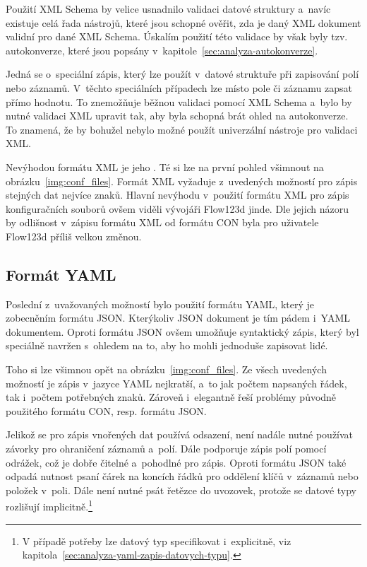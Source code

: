 \documentclass[FM,bw,DP]{tulthesis}
\begin{document}
Použití \gls{XML} Schema by velice usnadnilo validaci datové struktury a~navíc existuje celá řada nástrojů, které jsou schopné ověřit, zda je daný \gls{XML} dokument validní pro dané \gls{XML} Schema. Úskalím použití této validace by však byly tzv. autokonverze, které jsou popsány v~kapitole~\ref{sec:analyza-autokonverze}.

Jedná se o~speciální zápis, který lze použít v~datové struktuře při zapisování polí nebo záznamů. V~těchto speciálních případech lze místo pole či záznamu zapsat přímo hodnotu. To znemožňuje běžnou validaci pomocí XML Schema a~bylo by nutné validaci \gls{XML} upravit tak, aby byla schopná brát ohled na autokonverze. To znamená, že by bohužel nebylo možné použít univerzální nástroje pro validaci \gls{XML}.

Nevýhodou formátu \gls{XML} je jeho . Té si lze na první pohled všimnout na obrázku~\ref{img:conf_files}. Formát \gls{XML} vyžaduje z~uvedených možností pro zápis stejných dat nejvíce znaků. Hlavní nevýhodu v~použití formátu \gls{XML} pro zápis konfiguračních souborů ovšem viděli vývojáři Flow123d jinde. Dle jejich názoru by odlišnost v~zápisu formátu \gls{XML} od formátu \gls{CON} byla pro uživatele Flow123d příliš velkou změnou.

\subsection{Formát YAML}
\label{sec:problematika-format-yaml}

Poslední z~uvažovaných možností bylo použití formátu \gls{YAML}, který je zobecněním formátu \gls{JSON}. Kterýkoliv \gls{JSON} dokument je tím pádem i~\gls{YAML} dokumentem. Oproti formátu \gls{JSON} ovšem umožňuje syntaktický zápis, který byl speciálně navržen s~ohledem na to, aby ho mohli jednoduše zapisovat lidé.

Toho si lze všimnou opět na obrázku~\ref{img:conf_files}. Ze všech uvedených možností je zápis v~jazyce YAML nejkratší, a~to jak počtem napsaných řádek, tak i~počtem potřebných znaků. Zároveň i~elegantně řeší problémy původně použitého formátu \gls{CON}, resp. formátu \gls{JSON}.

Jelikož se pro zápis vnořených dat používá odsazení, není nadále nutné používat závorky pro ohraničení záznamů a~polí. Dále podporuje zápis polí pomocí odrážek, což je dobře čitelné a~pohodlné pro zápis. Oproti formátu \gls{JSON} také odpadá nutnost psaní čárek na koncích řádků pro oddělení klíčů v~záznamů nebo položek v~poli. Dále není nutné psát řetězce do uvozovek, protože se datové typy rozlišují implicitně.\footnote{V případě potřeby lze datový typ specifikovat i~explicitně, viz kapitola~\ref{sec:analyza-yaml-zapis-datovych-typu}.}
\end{document}
